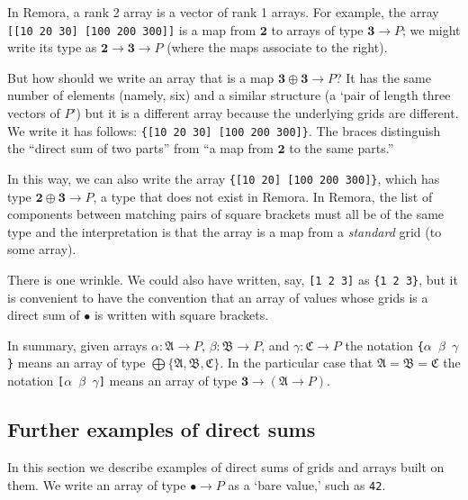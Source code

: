 \documentclass[11pt]{article}
\newcommand{\gr}[1]{\mathfrak{#1}}
\newcommand{\unit}{\bullet}
\newcommand{\two}{\mathbf{2}}
\newcommand{\three}{\mathbf{3}}
\begin{document}
In Remora, a rank 2 array is a vector of rank 1 arrays. For example, the array
\verb|[[10 20 30] [100 200 300]]| is a map from $\two$ to arrays of type $\three
\to P$; we might write its type as $\two \to \three \to P$ (where the maps associate
to the right).

But how should we write an array that is a map $\three\oplus\three \to P$? It has the
same number of elements (namely, six) and a similar structure (a `pair of length
three vectors of $P$') but it is a different array because the underlying grids
are different. We write it has follows: \verb|{[10 20 30] [100 200 300]}|. The
braces distinguish the ``direct sum of two parts'' from ``a map from $\two$ to
the same parts.''

In this way, we can also write the array \verb|{[10 20] [100 200 300]}|, which
has type $\two\oplus\three \to P$, a type that does not exist in Remora. In Remora, the
list of components between matching pairs of square brackets must all be of the
same type and the interpretation is that the array is a map from a
\emph{standard} grid (to some array).

There is one wrinkle. We could also have written, say, \verb|[1 2 3]| as
\verb|{1 2 3}|, but it is convenient to have the convention that an array of
values whose grids is a direct sum of $\unit$ is written with square brackets. 

In summary, given arrays $\alpha : \gr{A}\to P$, $\beta : \gr{B}\to P$, and $\gamma : \gr{C}\to P$
the notation \texttt{\{$\alpha$ $\beta$ $\gamma$\}} means an array of type $\bigoplus
\{\gr{A}, \gr{B}, \gr{C}\}$. In the particular case that $\gr{A} = \gr{B} =
\gr{C}$ the notation \texttt{[$\alpha$ $\beta$ $\gamma$]} means an array of type $\three\to
(\gr{A}\to P)$.



\subsection{Further examples of direct sums}

In this section we describe examples of direct sums of grids and arrays built on
them. We write an array of type $\unit\to P$ as a `bare value,' such as
\verb|42|.
\end{document}
